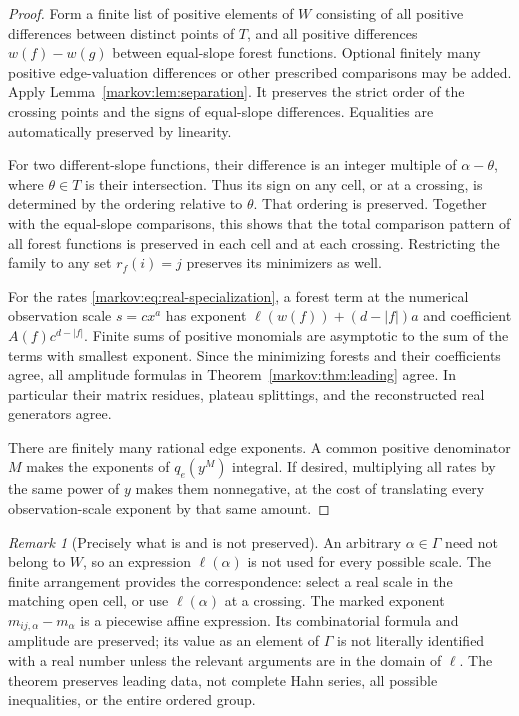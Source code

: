 \documentclass[11pt]{article}
\numberwithin{equation}{section}
\theoremstyle{definition}
\theoremstyle{remark}
\newtheorem{remark}[theorem]{Remark}
\begin{document}
\begin{proof}
Form a finite list of positive elements of $W$ consisting of all positive
differences between distinct points of $T$, and all positive differences
$w(f)-w(g)$ between equal-slope forest functions. Optional finitely many positive
edge-valuation differences or other prescribed comparisons may be added.
Apply Lemma~\ref{markov:lem:separation}. It preserves the strict order of the crossing
points and the signs of equal-slope differences. Equalities are automatically
preserved by linearity.

For two different-slope functions, their difference is an integer multiple of
$\alpha-\theta$, where $\theta\in T$ is their intersection. Thus its sign on
any cell, or at a crossing, is determined by the ordering relative to $\theta$.
That ordering is preserved. Together with the equal-slope comparisons, this
shows that the total comparison pattern of all forest functions is preserved
in each cell and at each crossing. Restricting the family to any set
$r_f(i)=j$ preserves its minimizers as well.

For the rates \eqref{markov:eq:real-specialization}, a forest term at the numerical
observation scale $s=cx^a$ has exponent
$\ell(w(f))+(d-|f|)a$ and coefficient $A(f)c^{d-|f|}$. Finite sums of positive
monomials are asymptotic to the sum of the terms with smallest exponent. Since
the minimizing forests and their coefficients agree, all amplitude formulas in
Theorem~\ref{markov:thm:leading} agree. In particular their matrix residues, plateau
splittings, and the reconstructed real generators agree.

There are finitely many rational edge exponents. A common positive denominator
$M$ makes the exponents of $q_e(y^M)$ integral. If desired, multiplying all rates
by the same power of $y$ makes them nonnegative, at the cost of translating every
observation-scale exponent by that same amount.
\end{proof}

\begin{remark}[Precisely what is and is not preserved]\label{markov:rem:preserved}
An arbitrary $\alpha\in\Gamma$ need not belong to $W$, so an expression
$\ell(\alpha)$ is not used for every possible scale. The finite arrangement
provides the correspondence: select a real scale in the matching open cell, or
use $\ell(\alpha)$ at a crossing. The marked exponent
$m_{ij,\alpha}-m_\alpha$ is a piecewise affine expression. Its combinatorial
formula and amplitude are preserved; its value as an element of $\Gamma$ is
not literally identified with a real number unless the relevant arguments are
in the domain of $\ell$. The theorem preserves leading data, not complete Hahn
series, all possible inequalities, or the entire ordered group.
\end{remark}
\end{document}
